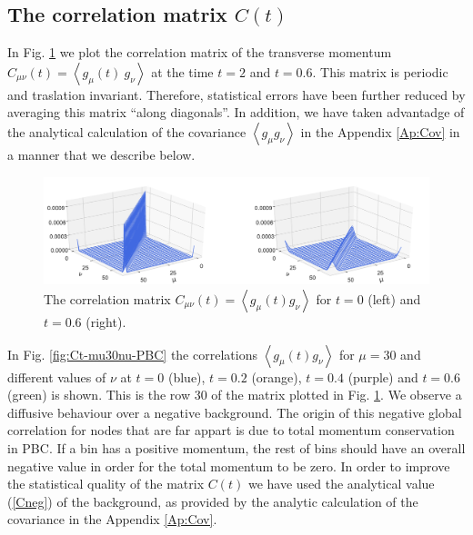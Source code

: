 \documentclass[a4paper,openright,12pt]{book}
\newcommand{\llangle}{\left\langle}
\newcommand{\rrangle}{\right\rangle}
\begin{document}
\subsection{The correlation matrix $C(t)$}

In  Fig. \ref{fig:Ct-matrix-PBC} we  plot the  correlation  matrix of  the
transverse     momentum      $C_{\mu\nu}(t)=\llangle     g_{\mu}(t)\
g_\nu\rrangle$ at  the time  $t=2$ and $t=0.6$.  This  matrix is  periodic and
traslation invariant.  Therefore, statistical errors have been further
reduced by averaging this matrix ``along diagonals''.  In addition, we
have taken advantadge of the  analytical calculation of the covariance
$\llangle g_{\mu} g_\nu\rrangle$ in the Appendix \ref{Ap:Cov} in a
manner that we describe below.

\begin{figure}[h!]
\centering
\includegraphics[scale=0.4]{Ct-matrix-PBC}
\caption[Correlation matrix $C(t)$ at $t=0$ and $t=0.6$ for PBC system.]{The   correlation    matrix   $C_{\mu\nu}(t)=\llangle
g_{\mu}(t)  g_\nu\rrangle$ for  $t=0$ (left) and $t=0.6$ (right).}
\label{fig:Ct-matrix-PBC}
\end{figure}

In  Fig.    \ref{fig:Ct-mu30nu-PBC}  the   correlations  $\llangle
g_{\mu}(t)  g_\nu\rrangle$ for  $\mu=30$ and  different values  of
$\nu$ at $t=0$ (blue), $t=0.2$ (orange), $t=0.4$ (purple) and $t= 0.6$ (green) is shown.  This is the row 30 of the matrix plotted
in Fig. \ref{fig:Ct-matrix-PBC}.  We  observe a diffusive
behaviour over  a negative  background.  The  origin of  this negative
global  correlation for  nodes that  are far  appart is  due to  total
momentum conservation in PBC.  If a bin has  a positive momentum, the rest of
bins should  have an  overall negative  value in  order for  the total
momentum to  be zero. In order  to improve the statistical  quality of
the matrix  $C(t)$ we have  used the analytical value  (\ref{Cneg}) of
the  background,  as  provided  by the  analytic  calculation  of  the
covariance in the Appendix \ref{Ap:Cov}.
\end{document}
